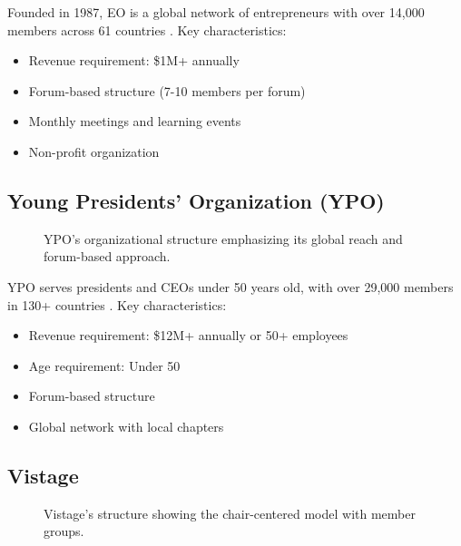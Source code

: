 \documentclass[conference]{IEEEtran}
\begin{document}
Founded in 1987, EO is a global network of entrepreneurs with over 14,000 members across 61 countries \cite{crews2020executive}. Key characteristics:
\begin{itemize}
\item Revenue requirement: \$1M+ annually
\item Forum-based structure (7-10 members per forum)
\item Monthly meetings and learning events
\item Non-profit organization
\end{itemize}

\subsection{Young Presidents' Organization (YPO)}
\begin{figure}[t]
\centering
{}
\caption{YPO's organizational structure emphasizing its global reach and forum-based approach.}
\label{fig:ypo_structure}
\end{figure}

YPO serves presidents and CEOs under 50 years old, with over 29,000 members in 130+ countries \cite{crews2020executive}. Key characteristics:
\begin{itemize}
\item Revenue requirement: \$12M+ annually or 50+ employees
\item Age requirement: Under 50
\item Forum-based structure
\item Global network with local chapters
\end{itemize}

\subsection{Vistage}
\begin{figure}[t]
\centering
{}
\caption{Vistage's structure showing the chair-centered model with member groups.}
\label{fig:vistage_structure}
\end{figure}
\end{document}
